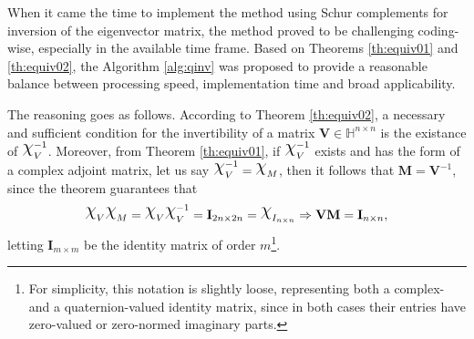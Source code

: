 When it came the time to implement the method using Schur complements for inversion of the eigenvector matrix, the method proved to be challenging coding-wise, especially in the available time frame. Based on Theorems \ref{th:equiv01} and \ref{th:equiv02}, the Algorithm \ref{alg:qinv} was proposed to provide a reasonable balance between processing speed, implementation time and broad applicability.

The reasoning goes as follows. According to Theorem \ref{th:equiv02}, a necessary and sufficient condition for the invertibility of a matrix $\mathbf{V} \in \mathbb{H}^{n \times n}$ is the existance of $\rchi^{-1}_{V}$. Moreover, from Theorem \ref{th:equiv01}, if $\rchi^{-1}_{V}$ exists and has the form of a complex adjoint matrix, let us say $\rchi_{V}^{-1} = \rchi_{M}$, then it follows that $\mathbf{M} = \mathbf{V}^{-1}$, since the theorem guarantees that
\begin{equation}
\rchi_{V} \rchi_{M} = \rchi_{V} \rchi_{V}^{-1} = \mathbf{I}_{2n \times 2n} = \rchi_{I_{n \times n}}
\Rightarrow \mathbf{V} \mathbf{M} = \mathbf{I}_{n \times n},
\end{equation}
letting $\mathbf{I}_{m \times m}$ be the identity matrix of order $m$\footnote{For simplicity, this notation is slightly loose, representing both a complex- and a quaternion-valued identity matrix, since in both cases their entries have zero-valued or zero-normed imaginary parts.}.

